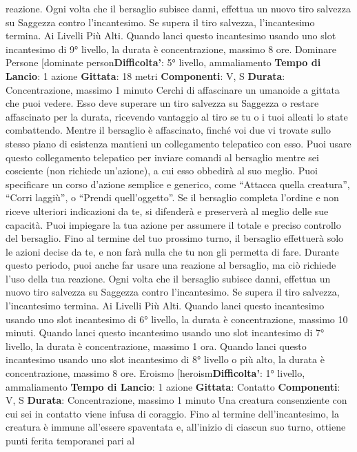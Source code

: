 \begin{multicols}{2}
reazione.
Ogni volta che il bersaglio subisce danni, effettua un
nuovo tiro salvezza su Saggezza contro l’incantesimo.
Se supera il tiro salvezza, l’incantesimo termina.
Ai Livelli Più Alti. Quando lanci questo incantesimo
usando uno slot incantesimo di 9° livello, la durata è
concentrazione, massimo 8 ore.
Dominare Persone
[dominate person\textbf{Difficolta'}:
5° livello, ammaliamento
\textbf{Tempo di Lancio}: 1 azione
\textbf{Gittata}: 18 metri
\textbf{Componenti}: V, S
\textbf{Durata}: Concentrazione, massimo 1 minuto
Cerchi di affascinare un umanoide a gittata che puoi
vedere. Esso deve superare un tiro salvezza su
Saggezza o restare affascinato per la durata, ricevendo
vantaggio al tiro se tu o i tuoi alleati lo state
combattendo.
Mentre il bersaglio è affascinato, finché voi due vi
trovate sullo stesso piano di esistenza mantieni un
collegamento telepatico con esso. Puoi usare questo
collegamento telepatico per inviare comandi al
bersaglio mentre sei cosciente (non richiede un’azione),
a cui esso obbedirà al suo meglio. Puoi specificare un
corso d’azione semplice e generico, come “Attacca
quella creatura”, “Corri laggiù”, o “Prendi quell’oggetto”.
Se il bersaglio completa l’ordine e non riceve ulteriori
indicazioni da te, si difenderà e preserverà al meglio
delle sue capacità.
Puoi impiegare la tua azione per assumere il totale e
preciso controllo del bersaglio. Fino al termine del tuo
prossimo turno, il bersaglio effettuerà solo le azioni
decise da te, e non farà nulla che tu non gli permetta di
fare. Durante questo periodo, puoi anche far usare una
reazione al bersaglio, ma ciò richiede l’uso della tua
reazione.
Ogni volta che il bersaglio subisce danni, effettua un
nuovo tiro salvezza su Saggezza contro l’incantesimo.
Se supera il tiro salvezza, l’incantesimo termina.
Ai Livelli Più Alti. Quando lanci questo incantesimo
usando uno slot incantesimo di 6° livello, la durata è
concentrazione, massimo 10 minuti. Quando lanci
questo incantesimo usando uno slot incantesimo di 7°
livello, la durata è concentrazione, massimo 1 ora.
Quando lanci questo incantesimo usando uno slot
incantesimo di 8° livello o più alto, la durata è
concentrazione, massimo 8 ore.
Eroismo
[heroism\textbf{Difficolta'}:
1° livello, ammaliamento
\textbf{Tempo di Lancio}: 1 azione
\textbf{Gittata}: Contatto
\textbf{Componenti}: V, S
\textbf{Durata}: Concentrazione, massimo 1 minuto
Una creatura consenziente con cui sei in contatto viene
infusa di coraggio. Fino al termine dell’incantesimo, la
creatura è immune all’essere spaventata e, all’inizio di
ciascun suo turno, ottiene punti ferita temporanei pari al

\end{multicols}
